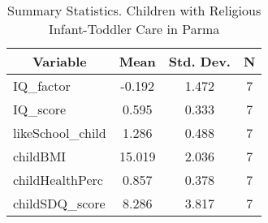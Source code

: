
\begin{table}[htbp]\centering \caption{Summary Statistics. Children with Religious Infant-Toddler Care in Parma \label{bothChildasiloReliParma}}
\begin{tabular}{l c c  c}\hline\hline
\multicolumn{1}{c}{\textbf{Variable}} & \textbf{Mean}
 & \textbf{Std. Dev.} & \textbf{N}\\ \hline
IQ\_factor & -0.192 & 1.472  & 7\\
IQ\_score & 0.595 & 0.333  & 7\\
likeSchool\_child & 1.286 & 0.488  & 7\\
childBMI & 15.019 & 2.036  & 7\\
childHealthPerc & 0.857 & 0.378  & 7\\
childSDQ\_score & 8.286 & 3.817  & 7\\
\hline\end{tabular}
\end{table}
